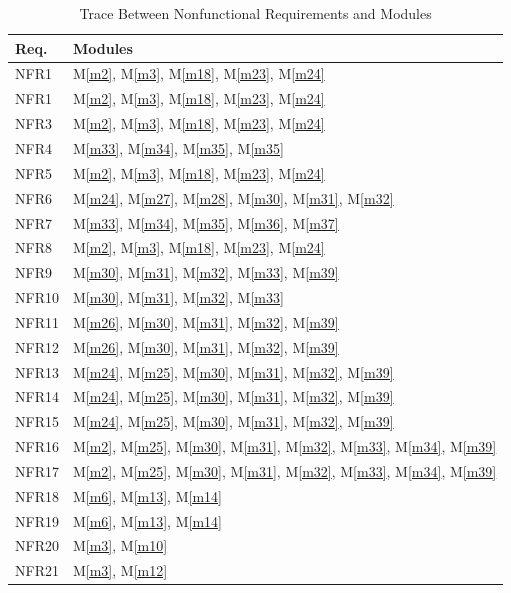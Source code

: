 \documentclass[12pt, titlepage]{article}
\newcommand{\mref}[1]{M\ref{#1}}
\begin{document}
	
	\begin{longtable}{p{} p{}}
		\caption{Trace Between Nonfunctional Requirements and Modules}
		\label{TblRT} \\
		\toprule
		\textbf{Req.} & \textbf{Modules}\\
		\midrule
		NFR1 & \mref{m2}, \mref{m3}, \mref{m18}, \mref{m23}, \mref{m24} \\
		NFR1 & \mref{m2}, \mref{m3}, \mref{m18}, \mref{m23}, \mref{m24} \\
		NFR3 & \mref{m2}, \mref{m3}, \mref{m18}, \mref{m23}, \mref{m24} \\
		NFR4 & \mref{m33}, \mref{m34}, \mref{m35}, \mref{m35} \\
		NFR5 & \mref{m2}, \mref{m3}, \mref{m18}, \mref{m23}, \mref{m24} \\
		NFR6 & \mref{m24}, \mref{m27}, \mref{m28}, \mref{m30}, \mref{m31}, \mref{m32} \\
		NFR7 & \mref{m33}, \mref{m34}, \mref{m35}, \mref{m36}, \mref{m37}\\
		NFR8 & \mref{m2}, \mref{m3}, \mref{m18}, \mref{m23}, \mref{m24} \\
		NFR9 & \mref{m30}, \mref{m31}, \mref{m32}, \mref{m33}, \mref{m39} \\
		NFR10 & \mref{m30}, \mref{m31}, \mref{m32}, \mref{m33} \\
		NFR11 & \mref{m26}, \mref{m30}, \mref{m31}, \mref{m32}, \mref{m39} \\
		NFR12 & \mref{m26}, \mref{m30}, \mref{m31}, \mref{m32}, \mref{m39} \\
		NFR13 & \mref{m24}, \mref{m25}, \mref{m30}, \mref{m31}, \mref{m32}, \mref{m39} \\
		NFR14 & \mref{m24}, \mref{m25}, \mref{m30}, \mref{m31}, \mref{m32}, \mref{m39} \\
		NFR15 & \mref{m24}, \mref{m25}, \mref{m30}, \mref{m31}, \mref{m32}, \mref{m39} \\
		NFR16 & \mref{m2}, \mref{m25}, \mref{m30}, \mref{m31}, \mref{m32}, \mref{m33}, \mref{m34}, \mref{m39} \\
		NFR17 & \mref{m2}, \mref{m25}, \mref{m30}, \mref{m31}, \mref{m32}, \mref{m33}, \mref{m34}, \mref{m39} \\
		NFR18 & \mref{m6}, \mref{m13}, \mref{m14}\\
		NFR19 & \mref{m6}, \mref{m13}, \mref{m14} \\
		NFR20 & \mref{m3}, \mref{m10} \\
		NFR21 & \mref{m3}, \mref{m12} \\

\end{longtable}
\end{document}
